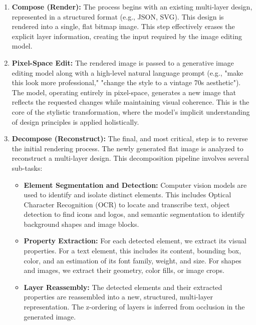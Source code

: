 \documentclass{article}
\begin{document}
\begin{enumerate}
    \item \textbf{Compose (Render):} The process begins with an existing multi-layer design, represented in a structured format (e.g., JSON, SVG). This design is rendered into a single, flat bitmap image. This step effectively erases the explicit layer information, creating the input required by the image editing model.

    \item \textbf{Pixel-Space Edit:} The rendered image is passed to a generative image editing model along with a high-level natural language prompt (e.g., "make this look more professional," "change the style to a vintage 70s aesthetic"). The model, operating entirely in pixel-space, generates a new image that reflects the requested changes while maintaining visual coherence. This is the core of the stylistic transformation, where the model's implicit understanding of design principles is applied holistically.

    \item \textbf{Decompose (Reconstruct):} The final, and most critical, step is to reverse the initial rendering process. The newly generated flat image is analyzed to reconstruct a multi-layer design. This decomposition pipeline involves several sub-tasks:
    \begin{itemize}
        \item \textbf{Element Segmentation and Detection:} Computer vision models are used to identify and isolate distinct elements. This includes Optical Character Recognition (OCR) to locate and transcribe text, object detection to find icons and logos, and semantic segmentation to identify background shapes and image blocks.

        \item \textbf{Property Extraction:} For each detected element, we extract its visual properties. For a text element, this includes its content, bounding box, color, and an estimation of its font family, weight, and size. For shapes and images, we extract their geometry, color fills, or image crops.

        \item \textbf{Layer Reassembly:} The detected elements and their extracted properties are reassembled into a new, structured, multi-layer representation. The z-ordering of layers is inferred from occlusion in the generated image.
    \end{itemize}
\end{enumerate}
\end{document}
